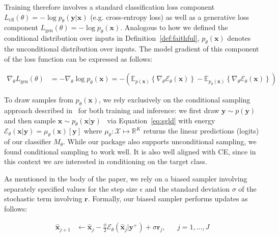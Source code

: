 Training therefore involves a standard classification loss component $L_{\text{clf}}(\theta)=-\log p_{\theta}(\mathbf{y}|\mathbf{x})$ (e.g. cross-entropy loss) as well as a generative loss component $L_{\text{gen}}(\theta)=-\log p_{\theta}(\mathbf{x})$. Analogous to how we defined the conditional distribution over inputs in Definition~\ref{def:faithful}, $p_{\theta}(\mathbf{x})$ denotes the unconditional distribution over inputs. The model gradient of this component of the loss function can be expressed as follows:

\begin{equation}\label{eq:gen-true}
  \begin{aligned}
    \nabla_{\theta}L_{\text{gen}}(\theta)&=-\nabla_{\theta}\log p_{\theta}(\mathbf{x})=-\left(\mathbb{E}_{p(\mathbf{x})} \left\{  \nabla_{\theta} \mathcal{E}_{\theta}(\mathbf{x}) \right\} - \mathbb{E}_{p_{\theta}(\mathbf{x})} \left\{  \nabla_{\theta} \mathcal{E}_{\theta}(\mathbf{x}) \right\} \right)
  \end{aligned}
\end{equation}

To draw samples from $p_{\theta}(\mathbf{x})$, we rely exclusively on the conditional sampling approach described in~\citet{grathwohl2020your} for both training and inference: we first draw $\mathbf{y}\sim p(\mathbf{y})$ and then sample $\mathbf{x} \sim p_{\theta}(\mathbf{x}|\mathbf{y})$~\citep{grathwohl2020your} via Equation~\ref{eq:sgld} with energy $\mathcal{E}_{\theta}(\mathbf{x}|\mathbf{y})=\mu_{\theta}(\mathbf{x})[\mathbf{y}]$ where $\mu_{\theta}: \mathcal{X} \mapsto \mathbb{R}^K$ returns the linear predictions (logits) of our classifier $M_{\theta}$. While our package also supports unconditional sampling, we found conditional sampling to work well. It is also well aligned with CE, since in this context we are interested in conditioning on the target class. 

As mentioned in the body of the paper, we rely on a biased sampler involving separately specified values for the step size $\epsilon$ and the standard deviation $\sigma$ of the stochastic term involving $\mathbf{r}$. Formally, our biased sampler performs updates as follows: 

\begin{equation}\label{eq:biased-sgld}
  \begin{aligned}
    \hat{\mathbf{x}}_{j+1} &\leftarrow \hat{\mathbf{x}}_j - \frac{\phi}{2} \mathcal{E}_{\theta}(\hat{\mathbf{x}}_j|\mathbf{y}^+) + \sigma \mathbf{r}_j, && j=1,...,J
  \end{aligned}
\end{equation}

